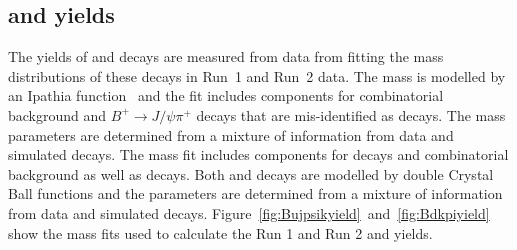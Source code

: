 {{%


\subsection[\bdkpi and \bujpsik yields]{\boldmath{\bdkpi} and \boldmath{\bujpsik} yields}
\label{sec:yeilds}
The yields of \bujpsik and \bdkpi decays are measured from data from fitting the mass distributions of these decays in Run~1 and Run~2 data. %
The \bujpsik mass \pdf is modelled by an Ipathia function~\cite{Santos:2013gra} and the fit includes components for combinatorial background and $B^{+} \to J/\psi \pi^{+}$ decays that are mis-identified as \bujpsik decays. The mass \pdf parameters are determined from a mixture of information from data and simulated decays. The \bdkpi mass fit includes components for \bskpi decays and combinatorial background as well as \bdkpi decays. Both \bdkpi and \bskpi decays are modelled by double Crystal Ball functions and the parameters are determined from a mixture of information from data and simulated decays. %
Figure~\ref{fig:Bujpsikyield}~and~\ref{fig:Bdkpiyield} show the mass fits used to calculate the Run 1 and Run 2 \bujpsik and \bdkpi yields.





}}
